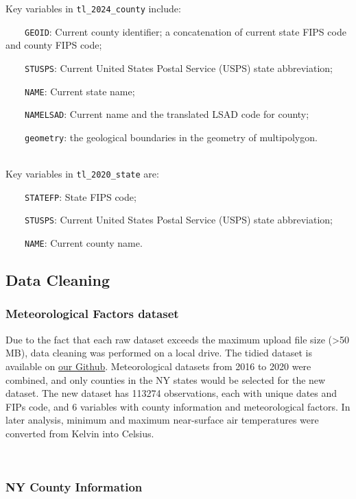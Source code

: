 \documentclass[
]{article}
\begin{document}
Key variables in \texttt{tl\_2024\_county} include:\\
\strut ~~~~\texttt{GEOID}: Current county identifier; a concatenation of
current state FIPS code and county FIPS code;\\
\strut ~~~~\texttt{STUSPS}: Current United States Postal Service (USPS)
state abbreviation;\\
\strut ~~~~\texttt{NAME}: Current state name;\\
\strut ~~~~\texttt{NAMELSAD}: Current name and the translated LSAD code
for county;\\
\strut ~~~~\texttt{geometry}: the geological boundaries in the geometry
of multipolygon.\\
\strut \\
Key variables in \texttt{tl\_2020\_state} are:\\
\strut ~~~~\texttt{STATEFP}: State FIPS code;\\
\strut ~~~~\texttt{STUSPS}: Current United States Postal Service (USPS)
state abbreviation;\\
\strut ~~~~\texttt{NAME}: Current county name.\\

\subsection{Data Cleaning}\label{data-cleaning}

\subsubsection{Meteorological Factors
dataset}\label{meteorological-factors-dataset}

Due to the fact that each raw dataset exceeds the maximum upload file
size (\textgreater50 MB), data cleaning was performed on a local drive.
The tidied dataset is available on
\href{https://github.com/jt4977/meteor.github.io/tree/main/df_gen}{our
Github}. Meteorological datasets from 2016 to 2020 were combined, and
only counties in the NY states would be selected for the new dataset.
The new dataset has 113274 observations, each with unique dates and FIPs
code, and 6 variables with county information and meteorological
factors. In later analysis, minimum and maximum near-surface air
temperatures were converted from Kelvin into Celsius.\\
\strut \\

\subsubsection{NY County Information}\label{ny-county-information}
\end{document}
